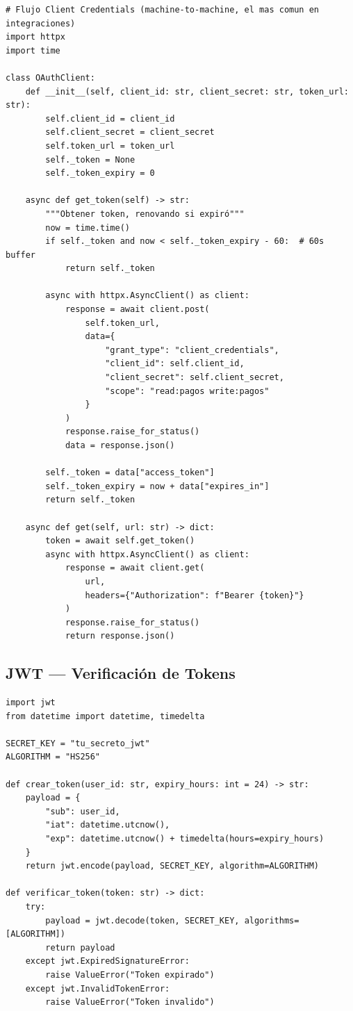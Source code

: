 \documentclass[11pt,a4paper]{article}
\begin{document}
\begin{lstlisting}[style=python]
# Flujo Client Credentials (machine-to-machine, el mas comun en integraciones)
import httpx
import time

class OAuthClient:
    def __init__(self, client_id: str, client_secret: str, token_url: str):
        self.client_id = client_id
        self.client_secret = client_secret
        self.token_url = token_url
        self._token = None
        self._token_expiry = 0

    async def get_token(self) -> str:
        """Obtener token, renovando si expiró"""
        now = time.time()
        if self._token and now < self._token_expiry - 60:  # 60s buffer
            return self._token

        async with httpx.AsyncClient() as client:
            response = await client.post(
                self.token_url,
                data={
                    "grant_type": "client_credentials",
                    "client_id": self.client_id,
                    "client_secret": self.client_secret,
                    "scope": "read:pagos write:pagos"
                }
            )
            response.raise_for_status()
            data = response.json()

        self._token = data["access_token"]
        self._token_expiry = now + data["expires_in"]
        return self._token

    async def get(self, url: str) -> dict:
        token = await self.get_token()
        async with httpx.AsyncClient() as client:
            response = await client.get(
                url,
                headers={"Authorization": f"Bearer {token}"}
            )
            response.raise_for_status()
            return response.json()
\end{lstlisting}

\subsection{JWT — Verificación de Tokens}

\begin{lstlisting}[style=python]
import jwt
from datetime import datetime, timedelta

SECRET_KEY = "tu_secreto_jwt"
ALGORITHM = "HS256"

def crear_token(user_id: str, expiry_hours: int = 24) -> str:
    payload = {
        "sub": user_id,
        "iat": datetime.utcnow(),
        "exp": datetime.utcnow() + timedelta(hours=expiry_hours)
    }
    return jwt.encode(payload, SECRET_KEY, algorithm=ALGORITHM)

def verificar_token(token: str) -> dict:
    try:
        payload = jwt.decode(token, SECRET_KEY, algorithms=[ALGORITHM])
        return payload
    except jwt.ExpiredSignatureError:
        raise ValueError("Token expirado")
    except jwt.InvalidTokenError:
        raise ValueError("Token invalido")
\end{lstlisting}
\end{document}
